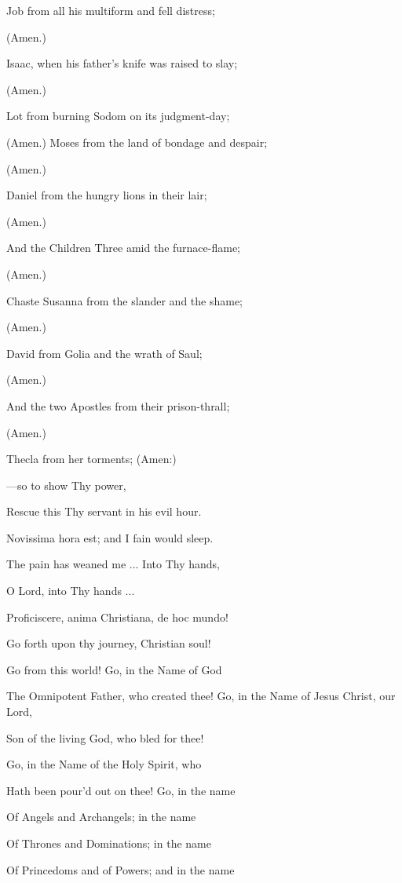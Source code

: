 Job from all his multiform and fell distress;

(Amen.)

Isaac, when his father's knife was raised to slay;

(Amen.)

Lot from burning Sodom on its judgment-day;

(Amen.)
Moses from the land of bondage and despair;

(Amen.)

Daniel from the hungry lions in their lair;

(Amen.)

And the Children Three amid the furnace-flame;

(Amen.)

Chaste Susanna from the slander and the shame;

(Amen.)

David from Golia and the wrath of Saul;

(Amen.)

And the two Apostles from their prison-thrall;

(Amen.)

Thecla from her torments; (Amen:)

—so to show Thy power,

Rescue this Thy servant in his evil hour.


Novissima hora est; and I fain would sleep.

The pain has weaned me ... Into Thy hands,

O Lord, into Thy hands ...


Proficiscere, anima Christiana, de hoc mundo!

Go forth upon thy journey, Christian soul!

Go from this world! Go, in the Name of God

The Omnipotent Father, who created thee! Go, in the Name of Jesus Christ, our Lord,

Son of the living God, who bled for thee!

Go, in the Name of the Holy Spirit, who

Hath been pour'd out on thee! Go, in the name

Of Angels and Archangels; in the name

Of Thrones and Dominations; in the name

Of Princedoms and of Powers; and in the name

